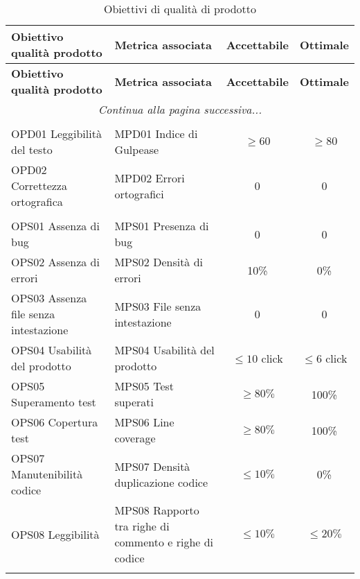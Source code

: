 \documentclass[../piano_di_qualifica.tex]{subfiles}
\begin{document}
\begin{center}
	\begin{longtable}{|p{5cm}|p{6cm}|c|c|}
		\hline
		\rowcolor{lightgray}
		\textbf{Obiettivo qualità prodotto}                    	& \textbf{Metrica associata}             & \textbf{Accettabile} & \textbf{Ottimale} \\
		\hline
		\endfirsthead
		\hline
		\rowcolor{lightgray}
		\textbf{Obiettivo qualità prodotto}                    	& \textbf{Metrica associata}             & \textbf{Accettabile} & \textbf{Ottimale} \\
		\hline
		\endhead
		
		\hline
		\multicolumn{4}{|c|}{\emph{Continua alla pagina successiva...}} \\
		\hline
		\endfoot
		\endlastfoot
		\hline \rowcolor{lightgray} \multicolumn{4}{|c|}{Documenti} \\
		\hline 
		OPD01 Leggibilità del testo           	& MPD01 Indice di Gulpease      						 & \(\ge 60\)		& \(\ge 80\)           \\
		OPD02 Correttezza ortografica         	& MPD02 Errori ortografici      						 & 0				& 0                    \\
		\hline \rowcolor{lightgray} \multicolumn{4}{|c|}{Software} \\
		\hline
		OPS01 Assenza di bug                  	& MPS01 Presenza di bug         						 & 0				& 0                    \\
		OPS02 Assenza di errori              	& MPS02 Densità di errori       						 & 10\%				& 0\%                  \\
		OPS03 Assenza file senza intestazione 	& MPS03 File senza intestazione 						 & 0				& 0                    \\
		OPS04 Usabilità del prodotto          	& MPS04 Usabilità del prodotto  						 & \(\leq10\) click	& \(\leq6\) click      \\
		OPS05 Superamento test					& MPS05 Test superati									 & \(\ge 80\%\)		& 100\%				  \\
		OPS06 Copertura test					& MPS06 Line coverage									 & \(\ge 80\%\)		& 100\%				  \\
		OPS07 Manutenibilità codice				& MPS07 Densità duplicazione codice 					 & \(\leq 10\%\)	& 0\%				  \\
		OPS08 Leggibilità						& MPS08 Rapporto tra righe di commento e righe di codice & \(\leq 10\%\)	&\(\leq 20\%\)				  \\
		\hline
		\rowcolor{white}
		\caption{Obiettivi di qualità di prodotto}
	\end{longtable}
\end{center}
\end{document}

